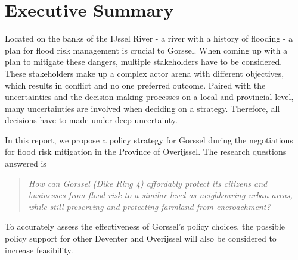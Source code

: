 \section*{Executive Summary}
\label{s:exec_summ}
\begin{multicols}{2}

\noindent Located on the banks of the IJssel River - a river with a history of flooding - a plan for flood risk management is crucial to Gorssel. When coming up with a plan to mitigate these dangers, multiple stakeholders have to be considered. These stakeholders make up a complex actor arena with different objectives, which results in conflict and no one preferred outcome. Paired with the uncertainties and the decision making processes on a local and provincial level, many uncertainties are involved when deciding on a strategy. Therefore, all decisions have to made under deep uncertainty. 

\noindent In this report, we propose a policy strategy for Gorssel during the negotiations for flood risk mitigation in the Province of Overijssel. The research questions answered is \vspace*{\fill} 
\begin{quote} 
\centering 
\textit{How can Gorssel (Dike Ring 4) affordably protect its citizens and businesses from flood risk to a similar level as neighbouring urban areas, while still preserving and protecting farmland from encroachment?}
\end{quote}
\vspace*{\fill}
To accurately assess the effectiveness of Gorssel's policy choices, the possible policy support for other Deventer and Overijssel will also be considered to increase feasibility. 

\bigskip


\end{multicols}
